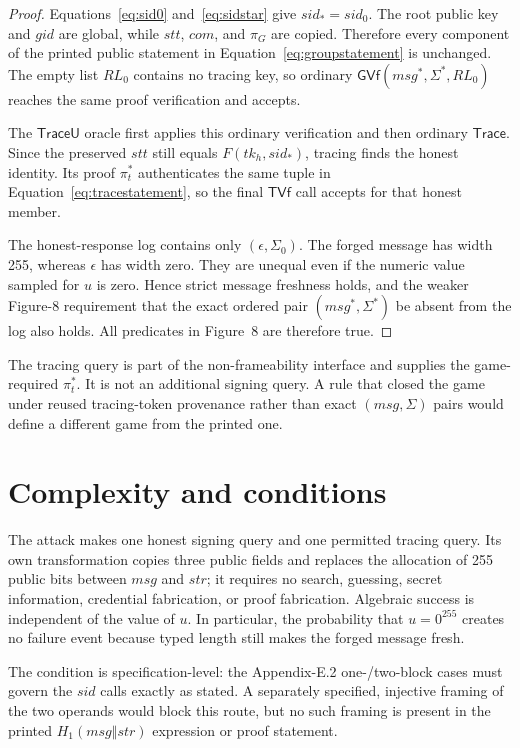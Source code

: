 \documentclass[10pt,a4paper]{article}
\newcommand{\Hone}{H_1}
\newcommand{\sid}{\mathit{sid}}
\newcommand{\strr}{\mathit{str}}
\newcommand{\stt}{\mathit{stt}}
\newcommand{\com}{\mathit{com}}
\newcommand{\msg}{\mathit{msg}}
\newcommand{\GVf}{\mathsf{GVf}}
\newcommand{\Trace}{\mathsf{Trace}}
\newcommand{\TVf}{\mathsf{TVf}}
\begin{document}
\begin{proof}
Equations~\eqref{eq:sid0} and~\eqref{eq:sidstar} give $\sid_*=\sid_0$.
The root public key and $\mathit{gid}$ are global, while $\stt$, $\com$, and
$\pi_G$ are copied. Therefore every component of the printed public statement
in Equation~\eqref{eq:groupstatement} is unchanged. The empty list $RL_0$
contains no tracing key, so ordinary $\GVf(\msg^*,\Sigma^*,RL_0)$ reaches the
same proof verification and accepts.

The $\mathsf{TraceU}$ oracle first applies this ordinary verification and then
ordinary $\Trace$. Since the preserved $\stt$ still equals
$F(\mathit{tk}_h,\sid_*)$, tracing finds the honest identity. Its proof
$\pi_t^*$ authenticates the same tuple in Equation~\eqref{eq:tracestatement},
so the final $\TVf$ call accepts for that honest member.

The honest-response log contains only $(\epsilon,\Sigma_0)$. The forged
message has width 255, whereas $\epsilon$ has width zero. They are unequal even
if the numeric value sampled for $u$ is zero. Hence strict message freshness
holds, and the weaker Figure-8 requirement that the exact ordered pair
$(\msg^*,\Sigma^*)$ be absent from the log also holds. All predicates in
Figure~8 are therefore true.
\end{proof}

The tracing query is part of the non-frameability interface and supplies the
game-required $\pi_t^*$. It is not an additional signing query. A rule that
closed the game under reused tracing-token provenance rather than exact
$(\msg,\Sigma)$ pairs would define a different game from the printed one.

\section{Complexity and conditions}

The attack makes one honest signing query and one permitted tracing query. Its
own transformation copies three public fields and replaces the allocation of
255 public bits between $\msg$ and $\strr$; it requires no search, guessing,
secret information, credential fabrication, or proof fabrication. Algebraic
success is independent of the value of $u$. In particular, the probability
that $u=0^{255}$ creates no failure event because typed length still makes the
forged message fresh.

The condition is specification-level: the Appendix-E.2 one-/two-block cases
must govern the $\sid$ calls exactly as stated. A separately specified,
injective framing of the two operands would block this route, but no such
framing is present in the printed $\Hone(\msg\Vert\strr)$ expression or
proof statement.
\end{document}
